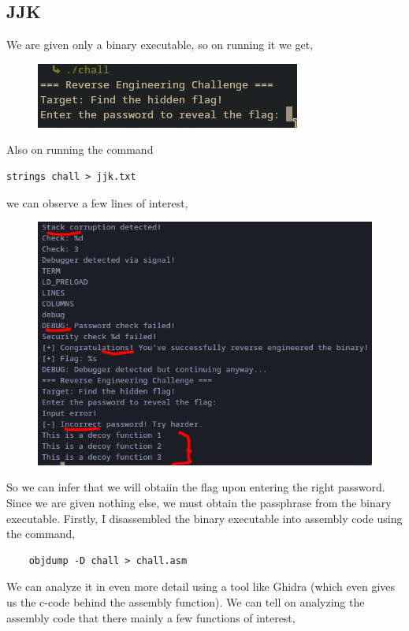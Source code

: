 \documentclass{article}
\begin{document}
\subsection{JJK}
We are given only a binary executable, so on running it we get, 
\begin{figure}[h!]
    \centering
    \includegraphics[width=0.6\linewidth]{figs/jjk1.png}
    \label{fig:enter-label}
\end{figure}
\newline Also on running the command \begin{verbatim}strings chall > jjk.txt \end{verbatim} we can observe a few lines of interest, 
\begin{figure}[h!]
    \centering
    \includegraphics[width=1\linewidth]{figs/jjk2.png}
    \label{fig:enter-label}
\end{figure}
\pagebreak
\newline So we can infer that we will obtaiin the flag upon entering the right password. Since we are given nothing else, we must obtain the passphrase from the binary executable. Firstly, I disassembled the binary executable into assembly code using the command, 
\begin{verbatim}
    objdump -D chall > chall.asm
\end{verbatim}
We can analyze it in even more detail using a tool like Ghidra (which even gives us the c-code behind the assembly function). We can tell on analyzing the assembly code that there mainly a few functions of interest, 
\end{document}
